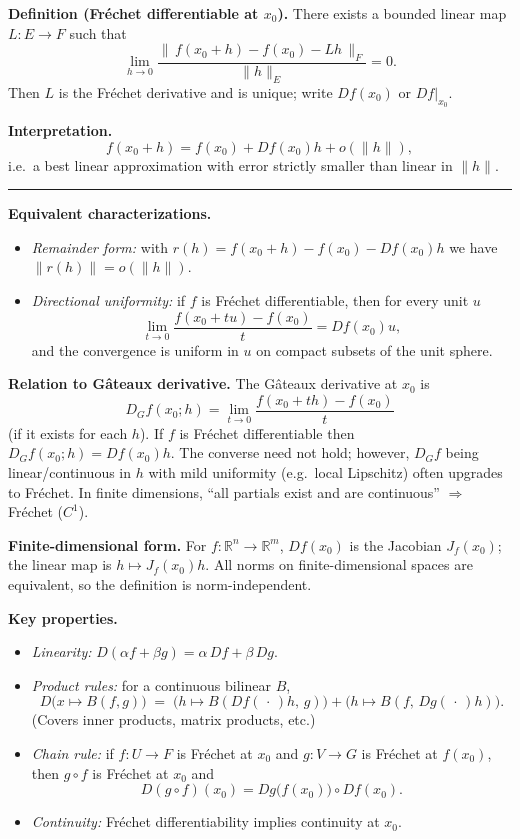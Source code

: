 \documentclass[12pt,a4paper]{article}
\theoremstyle{plain}
\theoremstyle{definition}
\theoremstyle{remark}
\theoremstyle{remark}
\newcommand{\sep}{\vspace{6pt}\hrule\vspace{8pt}}
\begin{document}
	\textbf{Definition (Fr\'echet differentiable at $x_0$).}
	There exists a bounded linear map $L:E\to F$ such that
	\[
	\lim_{h\to 0}\frac{\|\,f(x_0+h)-f(x_0)-Lh\,\|_F}{\|h\|_E}=0.
	\]
	Then $L$ is the Fr\'echet derivative and is unique; write $Df(x_0)$ or $Df\big|_{x_0}$.
	
	\textbf{Interpretation.}
	\[
	f(x_0+h)=f(x_0)+Df(x_0)h + o(\|h\|),
	\]
	i.e.\ a best linear approximation with error strictly smaller than linear in $\|h\|$.
	
	\sep
	
	\textbf{Equivalent characterizations.}
	\begin{itemize}
		\item \emph{Remainder form:} with $r(h)=f(x_0+h)-f(x_0)-Df(x_0)h$ we have $\|r(h)\|=o(\|h\|)$.
		\item \emph{Directional uniformity:} if $f$ is Fr\'echet differentiable, then for every unit $u$
		\[
		\lim_{t\to 0}\frac{f(x_0+tu)-f(x_0)}{t}=Df(x_0)u,
		\]
		and the convergence is uniform in $u$ on compact subsets of the unit sphere.
	\end{itemize}
	
	\textbf{Relation to G\^ateaux derivative.}
	The G\^ateaux derivative at $x_0$ is
	\[
	D_G f(x_0;h)=\lim_{t\to 0}\frac{f(x_0+th)-f(x_0)}{t}
	\]
	(if it exists for each $h$). If $f$ is Fr\'echet differentiable then $D_G f(x_0;h)=Df(x_0)h$.
	The converse need not hold; however, $D_G f$ being linear/continuous in $h$ with mild
	uniformity (e.g.\ local Lipschitz) often upgrades to Fr\'echet. In finite dimensions,
	“all partials exist and are continuous” $\Rightarrow$ Fr\'echet ($C^1$).
	
	\textbf{Finite-dimensional form.}
	For $f:\mathbb{R}^n\to\mathbb{R}^m$, $Df(x_0)$ is the Jacobian $J_f(x_0)$; the linear map is
	$h\mapsto J_f(x_0)h$. All norms on finite-dimensional spaces are equivalent, so the definition
	is norm-independent.
	
	\textbf{Key properties.}
	\begin{itemize}
		\item \emph{Linearity:} $D(\alpha f+\beta g)=\alpha\,Df+\beta\,Dg$.
		\item \emph{Product rules:} for a continuous bilinear $B$, 
		\[
		D\big(x\mapsto B(f,g)\big)
		\;=\; \big(h\mapsto B(Df(\,\cdot\,)h,\,g)\big) + \big(h\mapsto B(f,\,Dg(\,\cdot\,)h)\big).
		\]
		(Covers inner products, matrix products, etc.)
		\item \emph{Chain rule:} if $f:U\to F$ is Fr\'echet at $x_0$ and $g:V\to G$ is Fr\'echet at $f(x_0)$,
		then $g\circ f$ is Fr\'echet at $x_0$ and
		\[
		D(g\circ f)(x_0)=Dg\big(f(x_0)\big)\circ Df(x_0).
		\]
		\item \emph{Continuity:} Fr\'echet differentiability implies continuity at $x_0$.
	\end{itemize}
	
\end{document}
